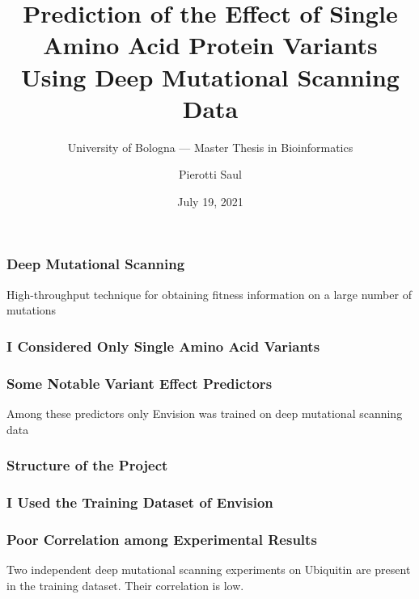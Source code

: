 \documentclass[10pt, british]{beamer}
\title[Single Aminoacid Variants Prediction]{Prediction of the Effect of Single Amino Acid Protein
	Variants\\Using Deep Mutational Scanning Data}
\subtitle[]{University of Bologna --- Master Thesis in Bioinformatics}
\author[Pierotti Saul]{Pierotti Saul}
\date{July 19, 2021}
\begin{document}
\begin{frame}[plain]
	\titlepage%
\end{frame}

\begin{frame}
	\frametitle{Deep Mutational Scanning}
	High-throughput technique for obtaining fitness information on a large number of mutations
	\vfill%
	\begin{figure}
		
	\end{figure}
\end{frame}

\begin{frame}
	\frametitle{I Considered Only Single Amino Acid Variants}
	\vfill%
	\begin{figure}
		
	\end{figure}
\end{frame}

\begin{frame}
	\frametitle{Some Notable Variant Effect Predictors}
	\begin{figure}
		
	\end{figure}
	\vfill%
	Among these predictors only Envision was trained on deep mutational scanning data
\end{frame}

\begin{frame}
	\frametitle{Structure of the Project}
	\begin{figure}
		
	\end{figure}
\end{frame}

\begin{frame}
	\frametitle{I Used the Training Dataset of Envision {\small\parencite{Gray2018}}}
	\vfill%
	\centering%
	{%
		\let\bfseries\sbseries%
		
		
	}
\end{frame}

\begin{frame}
	\frametitle{Poor Correlation among Experimental Results}
	Two independent deep mutational scanning experiments on Ubiquitin are present in the training dataset.
	Their correlation is low.
	\vfill%
	\centering%
	{%
		\let\bfseries\sbseries%
		
	}
\end{frame}
\end{document}
